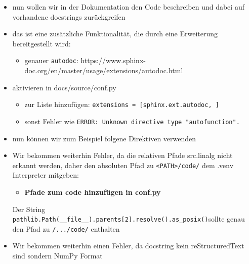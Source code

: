 \begin{itemize}
\tightlist
\item
  nun wollen wir in der Dokumentation den Code beschreiben und dabei auf
  vorhandene docstrings zurückgreifen
\item
  das ist eine zusätzliche Funktionalität, die durch eine Erweiterung
  bereitgestellt wird:

  \begin{itemize}
  \tightlist
  \item
    genauer \texttt{autodoc}:
    https://www.sphinx-doc.org/en/master/usage/extensions/autodoc.html
  \end{itemize}
\item
  aktivieren in docs/source/conf.py

  \begin{itemize}
  \tightlist
  \item
    zur Liste hinzufügen:
    \texttt{extensions\ =\ {[}\textquotesingle{}sphinx.ext.autodoc\textquotesingle{},\ {]}}
  \item
    sonst Fehler wie
    \texttt{ERROR:\ Unknown\ directive\ type\ "autofunction".}
  \end{itemize}
\item
  nun können wir zum Beispiel folgene Direktiven verwenden
\end{itemize}

\begin{Shaded}
\begin{Highlighting}[]
 
\end{Highlighting}
\end{Shaded}

\begin{itemize}
\item
  Wir bekommen weiterhin Fehler, da die relativen Pfade src.linalg nicht
  erkannt werden, daher den absoluten Pfad zu
  \texttt{\textless{}PATH\textgreater{}/code/} dem .venv Interpreter
  mitgeben:

  \begin{itemize}
  \tightlist
  \item
    \textbf{Pfade zum code hinzufügen in conf.py}
  \end{itemize}

\begin{Shaded}
\begin{Highlighting}[]
\NormalTok{).parents[}\NormalTok{].resolve().as_posix())}
\end{Highlighting}
\end{Shaded}

  Der String
  \texttt{pathlib.Path(\_\_file\_\_).parents{[}2{]}.resolve().as\_posix()}sollte
  genau den Pfad zu \texttt{/.../code/} enthalten
\item
  Wir bekommen weiterhin einen Fehler, da docstring kein
  reStructuredText sind sondern NumPy Format
\end{itemize}

